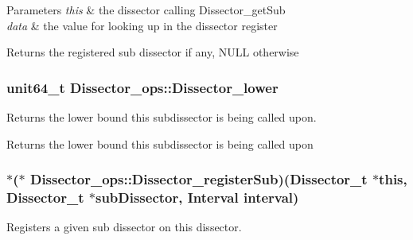 \begin{DoxyParams}{Parameters}
{\em this} & the dissector calling Dissector\-\_\-get\-Sub \\
\hline
{\em data} & the value for looking up in the dissector register\\
\hline
\end{DoxyParams}
\begin{DoxyReturn}{Returns}
the registered sub dissector if any, N\-U\-L\-L otherwise 
\end{DoxyReturn}
\hypertarget{struct_dissector__ops_a12f42148d4173471c21f3b33296d9256}{
\subsubsection[{Dissector\-\_\-lower}]{\setlength{\rightskip}{0pt plus 5cm}unit64\-\_\-t Dissector\-\_\-ops\-::\-Dissector\-\_\-lower}}\label{struct_dissector__ops_a12f42148d4173471c21f3b33296d9256}


Returns the lower bound this subdissector is being called upon. 

\begin{DoxyReturn}{Returns}
the lower bound this subdissector is being called upon 
\end{DoxyReturn}
\hypertarget{struct_dissector__ops_ac7b5b8ae6f666ad291eede1507effc20}{
\subsubsection[{Dissector\-\_\-register\-Sub}]{$\ast$($\ast$ Dissector\-\_\-ops\-::\-Dissector\-\_\-register\-Sub)({\bf Dissector\-\_\-t} $\ast$this, {\bf Dissector\-\_\-t} $\ast$sub\-Dissector, Interval interval)}}\label{struct_dissector__ops_ac7b5b8ae6f666ad291eede1507effc20}


Registers a given sub dissector on this dissector. 


